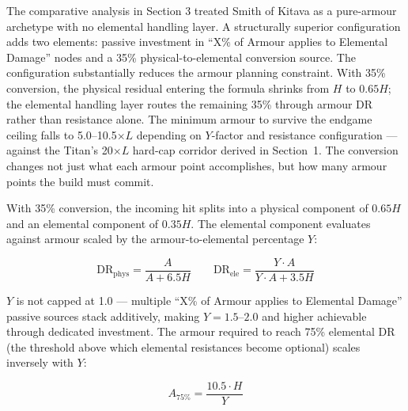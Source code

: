\documentclass[12pt, letterpaper]{article}
\begin{document}
The comparative analysis in Section 3 treated Smith of Kitava as a pure-armour archetype with no elemental handling layer. A structurally superior configuration adds two elements: passive investment in ``X\% of Armour applies to Elemental Damage'' nodes and a 35\% physical-to-elemental conversion source. The configuration substantially reduces the armour planning constraint. With 35\% conversion, the physical residual entering the formula shrinks from $H$ to $0.65H$; the elemental handling layer routes the remaining 35\% through armour DR rather than resistance alone. The minimum armour to survive the endgame ceiling falls to 5.0--10.5$\times L$ depending on $Y$-factor and resistance configuration --- against the Titan's 20$\times L$ hard-cap corridor derived in Section~1. The conversion changes not just what each armour point accomplishes, but how many armour points the build must commit.

With 35\% conversion, the incoming hit splits into a physical component of $0.65H$ and an elemental component of $0.35H$. The elemental component evaluates against armour scaled by the armour-to-elemental percentage $Y$:

\[
\text{DR}_{\text{phys}} = \frac{A}{A + 6.5H} \qquad \text{DR}_{\text{ele}} = \frac{Y \cdot A}{Y \cdot A + 3.5H}
\]

$Y$ is not capped at 1.0 --- multiple ``X\% of Armour applies to Elemental Damage'' passive sources stack additively, making $Y = 1.5$--$2.0$ and higher achievable through dedicated investment. The armour required to reach 75\% elemental DR (the threshold above which elemental resistances become optional) scales inversely with $Y$:

\[
A_{75\%} = \frac{10.5 \cdot H}{Y}
\]
\end{document}
